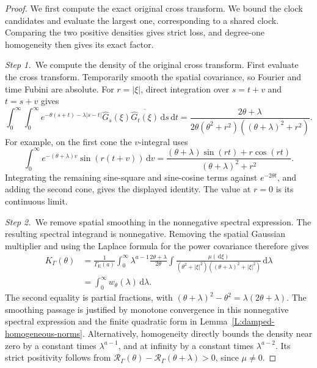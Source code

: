\documentclass[12pt,oneside,openany]{book}
\numberwithin{equation}{section}
\theoremstyle{nogostyle}
\theoremstyle{definition}
\newcommand{\ud}{\,\mathrm{d}}
\begin{document}
\begin{proof}
  We first compute the exact original cross transform. We bound the clock
  candidates and evaluate the largest one, corresponding to a shared clock.
  Comparing the two positive densities gives strict loss, and degree-one
  homogeneity then gives its exact factor.


  \medskip
  \noindent\textit{Step 1.~}We compute the density of the original cross
  transform.
  First evaluate the cross transform. Temporarily smooth the spatial covariance,
  so Fourier and time Fubini are absolute. For \(r=|\xi|\), direct integration
  over \(s=t+v\) and \(t=s+v\) gives
  \[
    \int_0^\infty\int_0^\infty
    e^{-\theta(s+t)-\lambda|s-t|}
    \widehat{G}_s(\xi)\overline{\widehat{G}_t(\xi)}\ud s\ud t
    =\frac{2\theta+\lambda}
    {2\theta(\theta^2+r^2)((\theta+\lambda)^2+r^2)} .
  \]
  For example, on the first cone the \(v\)-integral uses
  \[
    \int_0^\infty e^{-(\theta+\lambda)v}
    \sin(r(t+v))\ud v
    =\frac{(\theta+\lambda)\sin(rt)+r\cos(rt)}
    {(\theta+\lambda)^2+r^2}.
  \]
  Integrating the remaining sine-square and sine-cosine terms against
  \(e^{-2\theta t}\), and adding the second cone, gives the displayed identity.
  The value at \(r=0\) is its continuous limit.


  \medskip
  \noindent\textit{Step 2.~}We remove spatial smoothing in the nonnegative
  spectral expression.
  The resulting spectral integrand is nonnegative. Removing the spatial Gaussian
  multiplier and using the Laplace formula for the power covariance therefore
  gives
  \[
    \begin{split}
      K_\Gamma(\theta)
      &=\frac1{\Gamma_{\mathrm{E}}(a)}
      \int_0^\infty\lambda^{a-1}
      \frac{2\theta+\lambda}{2\theta}
      \int\frac{\mu(\ud\xi)}
      {(\theta^2+|\xi|^2)((\theta+\lambda)^2+|\xi|^2)}
      \ud\lambda\\
      &=\int_0^\infty w_\theta(\lambda)\ud\lambda.
    \end{split}
  \]
  The second equality is partial fractions, with
  \((\theta+\lambda)^2-\theta^2=\lambda(2\theta+\lambda)\). The smoothing
  passage is justified by monotone convergence in this nonnegative spectral
  expression and the finite quadratic form in
  Lemma~\ref{L:damped-homogeneous-norms}. Alternatively, homogeneity directly
  bounds the density near zero by a constant times \(\lambda^{a-1}\), and at
  infinity by a constant times \(\lambda^{a-2}\). Its strict positivity follows
  from \(\mathcal{R}_\Gamma(\theta) -\mathcal{R}_\Gamma(\theta+\lambda)>0\),
  since \(\mu\ne0\).



\end{proof}
\end{document}
